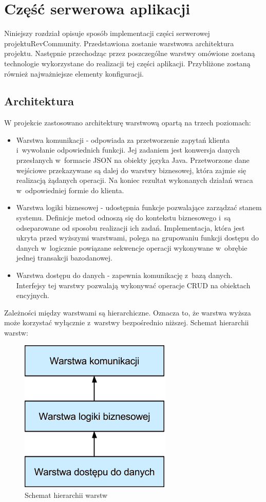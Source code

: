 \chapter{Część serwerowa aplikacji}

Niniejszy rozdział opisuje sposób implementacji części serwerowej projektu\newline RevCommunity. Przedstawiona zostanie warstwowa architektura projektu. Następnie przechodząc przez poszczególne warstwy omówione zostaną technologie wykorzystane do realizacji tej części aplikacji. Przybliżone zostaną również najważniejsze elementy konfiguracji.

\section{Architektura}
W projekcie zastosowano architekturę warstwową opartą na trzech poziomach:

\begin{itemize}
\item Warstwa komunikacji - odpowiada za przetworzenie zapytań klienta i~wywołanie odpowiednich funkcji. Jej zadaniem jest konwersja danych przesłanych w~formacie JSON na obiekty języka Java. Przetworzone dane wejściowe przekazywane są dalej do warstwy biznesowej, która zajmie się realizacją żądanych operacji. Na koniec rezultat wykonanych działań wraca w~odpowiedniej formie do klienta.
\item Warstwa logiki biznesowej - udostępnia funkcje pozwalające zarządzać stanem systemu. Definicje metod odnoszą się do kontekstu biznesowego i~są odseparowane od sposobu realizacji ich zadań. Implementacja, która jest ukryta przed wyższymi warstwami, polega na grupowaniu funkcji dostępu do danych w~logicznie powiązane sekwencje operacji wykonywane w~obrębie jednej transakcji bazodanowej.
\item Warstwa dostępu do danych - zapewnia komunikację z~bazą danych. Interfejsy tej warstwy pozwalają wykonywać operacje CRUD na obiektach encyjnych.
\end{itemize}

Zależności między warstwami są hierarchiczne. Oznacza to, że warstwa wyższa może korzystać wyłącznie z~warstwy bezpośrednio niższej. 
Schemat hierarchii warstw:

\begin{figure}[H]
	\centering
	\includegraphics[scale=1]{images/warstwy_serwer.png}
	\caption{Schemat hierarchii warstw}
\end{figure}

